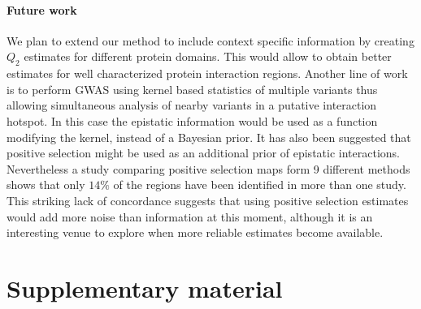 \paragraph{Future work}
We plan to extend our method to include context specific information by creating $Q_2$ estimates for different protein domains. This would allow to obtain better estimates for well characterized protein interaction regions. Another line of work is to perform GWAS using kernel based statistics of multiple variants \cite{wu2011rare} thus allowing simultaneous analysis of nearby variants in a putative interaction hotspot. In this case the epistatic information would be used as a function modifying the kernel, instead of a Bayesian prior.
It has also been suggested that positive selection might be used as an additional prior of epistatic interactions. Nevertheless a study comparing positive selection maps form 9 different methods \cite{akey2009constructing} shows that only $14\%$ of the regions have been identified in more than one study.  This striking lack of concordance suggests that using positive selection estimates would add more noise than information at this moment, although it is an interesting venue to explore when more reliable estimates become available.

\section{Supplementary material}





